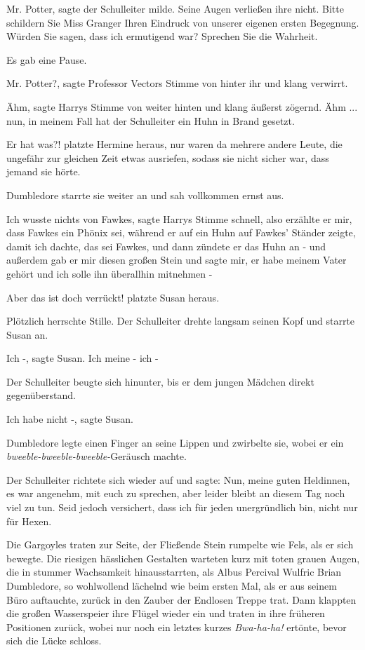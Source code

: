 \glqq Mr. Potter\grqq{}, sagte der Schulleiter milde. Seine Augen verließen ihre
nicht. \glqq Bitte schildern Sie Miss Granger Ihren Eindruck von unserer eigenen
ersten Begegnung. Würden Sie sagen, dass ich ermutigend war? Sprechen Sie die
Wahrheit.\grqq{}

Es gab eine Pause.

\glqq Mr. Potter?\grqq{}, sagte Professor Vectors Stimme von hinter ihr und
klang verwirrt.

\glqq Ähm\grqq{}, sagte Harrys Stimme von weiter hinten und klang äußerst
zögernd. \glqq Ähm ... nun, in meinem Fall hat der Schulleiter ein Huhn in Brand
gesetzt.\grqq{}

\glqq Er hat was?!\grqq{} platzte Hermine heraus, nur waren da mehrere andere
Leute, die ungefähr zur gleichen Zeit etwas ausriefen, sodass sie nicht sicher
war, dass jemand sie hörte.

Dumbledore starrte sie weiter an und sah vollkommen ernst aus.

\glqq Ich wusste nichts von Fawkes\grqq{}, sagte Harrys Stimme schnell, \glqq
also erzählte er mir, dass Fawkes ein Phönix sei, während er auf ein Huhn auf
Fawkes' Ständer zeigte, damit ich dachte, das sei Fawkes, und dann zündete er
das Huhn an - und außerdem gab er mir diesen großen Stein und sagte mir, er habe
meinem Vater gehört und ich solle ihn überallhin mitnehmen -\grqq{}

\glqq Aber das ist doch verrückt!\grqq{} platzte Susan heraus.

Plötzlich herrschte Stille. Der Schulleiter drehte langsam seinen Kopf und
starrte Susan an.

\glqq Ich -\grqq{}, sagte Susan. \glqq Ich meine - ich -\grqq{}

Der Schulleiter beugte sich hinunter, bis er dem jungen Mädchen direkt
gegenüberstand.

\glqq Ich habe nicht -\grqq{}, sagte Susan.

Dumbledore legte einen Finger an seine Lippen und zwirbelte sie, wobei er ein
\emph{bweeble-bweeble-bweeble-}Geräusch machte.

Der Schulleiter richtete sich wieder auf und sagte: \glqq Nun, meine guten
Heldinnen, es war angenehm, mit euch zu sprechen, aber leider bleibt an diesem
Tag noch viel zu tun. Seid jedoch versichert, dass ich für jeden unergründlich
bin, nicht nur für Hexen.\grqq{}

Die Gargoyles traten zur Seite, der Fließende Stein rumpelte wie Fels, als er
sich bewegte. Die riesigen hässlichen Gestalten warteten kurz mit toten grauen
Augen, die in stummer Wachsamkeit hinausstarrten, als Albus Percival Wulfric
Brian Dumbledore, so wohlwollend lächelnd wie beim ersten Mal, als er aus seinem
Büro auftauchte, zurück in den Zauber der Endlosen Treppe trat. Dann klappten
die großen Wasserspeier ihre Flügel wieder ein und traten in ihre früheren
Positionen zurück, wobei nur noch ein letztes kurzes \glqq
\emph{Bwa-ha-ha!}\grqq{} ertönte, bevor sich die Lücke schloss.

